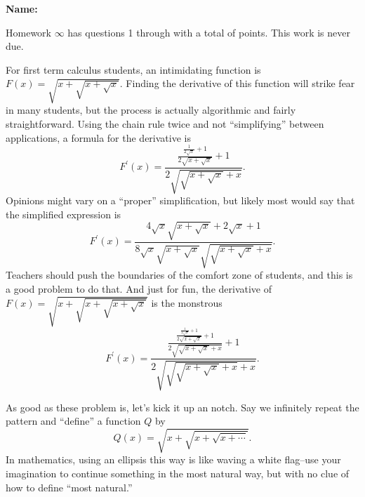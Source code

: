 \documentclass[12pt,fleqn,answers]{exam}
\newcommand{\quiz}{$\infty$}
\newcommand{\term}{Fall}
\begin{document}
\vspace{0.1in}
\noindent{}
{\bf Name:}  \\
\noindent \makebox[3.0truein][l]{\textbf{Homework \quiz, \term \/ \the\year}}
\vspace{0.1in}

\noindent  Homework \quiz\/  has questions 1 through  \numquestions \/ with a total 
of  \numpoints\/  points. 
This work is never due.


\begin{questions}

 \question For first term calculus students, an intimidating function is $F(x) = \sqrt{x + \sqrt{x + \sqrt{x}}}$. Finding the derivative of 
 this function will strike fear in many students, but the process is actually algorithmic  and fairly straightforward.  Using the chain rule twice and not ``simplifying'' between applications,   a formula for the derivative is
\begin{equation*}
F^\prime(x) = \frac{\frac{\frac{1}{2 \sqrt{x}}+1}{2 \sqrt{x+\sqrt{x}}}+1}{2 \sqrt{\sqrt{x+\sqrt{x}}+x}}.
\end{equation*}
Opinions might vary on a ``proper'' simplification, but likely most would say that the simplified expression is
\begin{equation*}
F^\prime(x) = \frac{4 \sqrt{x} \sqrt{x+\sqrt{x}}+2 \sqrt{x}+1}{8 \sqrt{x} \sqrt{x+\sqrt{x}} \sqrt{\sqrt{x+\sqrt{x}}+x}}.
  \end{equation*}
Teachers should push   the boundaries of the comfort zone of students, and this is a good problem to do that.  And just for fun, the derivative of 
  $F(x) = \sqrt{x+\sqrt{x + \sqrt{x + \sqrt{x}}}}$ is the monstrous   
  \begin{equation*}
 F^\prime(x) =  \frac{\frac{\frac{\frac{1}{2 \sqrt{x}}+1}{2 \sqrt{x+\sqrt{x}}}+1}{2 \sqrt{\sqrt{x+\sqrt{x}}+x}}+1}{2 \sqrt{\sqrt{\sqrt{x+\sqrt{x}}+x}+x}}.
  \end{equation*}
  
  \quad As good as these problem is, let's kick it up an notch.  Say we infinitely repeat the pattern and ``define''  a function $Q$ by
  \begin{equation*}
 Q(x) = \sqrt{x + \sqrt{x + \sqrt{x + \cdots}}}.
\end{equation*}
In mathematics, using an ellipsis this way is like waving a white flag--use your imagination to continue something in the most natural way, 
but with no clue of how to define ``most natural.''  


\end{questions}
\end{document}

